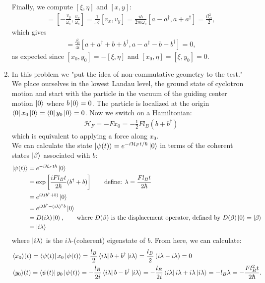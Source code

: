 \documentclass{article}
\theoremstyle{definition}
\newcommand{\ham}{\mathcal{H}}
\newcommand{\be}{\beta}
\newcommand{\f}[2]{\frac{#1}{#2}}
\newcommand{\lp}{\left(}
\newcommand{\rp}{\right)}
\newcommand{\lb}{\left[}
\newcommand{\rb}{\right]}
\begin{document}
\begin{enumerate}[label=\alph*)]
	\noindent Finally, we compute $[\xi,\eta]$ and $[x,y]$:
	\begin{align*}
	[\xi,\eta] = \lb -\f{v_y}{\omega_c}, \f{v_x}{\omega_c} \rb = \f{1}{\omega_c^2}[v_x,v_y] = \f{i\hbar }{2m\omega_c} [a-a^\dagger , a+a^\dagger] = \f{il_B^2}{2},
	\end{align*}
	which gives
	\begin{align*}
	[x,y] = \f{l_B^2}{4i} [a+a^\dagger + b+b^\dagger, a-a^\dagger - b + b^\dagger] = 0,
	\end{align*}
	as expected since $[x_0,y_0] = -[\xi,\eta]$ and $[x_0,\eta] = [\xi,y_0] = 0$. 
	
	\item In this problem we "put the idea of non-commutative geometry to the test." We place ourselves in the lowest Landau level, the ground state of cyclotron motion and start with the particle in the vacuum of the guiding center motion $\ket{0}$ where $b\ket{0} = 0$. The particle is localized at the origin $\bra{0} x_0 \ket{0} = \bra{0} y_0 \ket{0} = 0$. Now we switch on a Hamiltonian:
	\begin{align*}
		\ham_F = -F x_0 = -\f{1}{2} Fl_B (b+b^\dagger)
	\end{align*}
	which is equivalent to applying a force along $x_0$. \\
	
	We can calculate the state $\ket{\psi(t)} = e^{-i\ham_F t/\hbar}\ket{0}$ in terms of the coherent states $\ket{\be}$ associated with $b$:
	\begin{align*}
		\ket{\psi(t)} 
		&= e^{-i\ham_F t\hbar} \ket{0} \\ 
		&= \exp\lb \f{iFl_B t}{2\hbar} (b^\dagger + b) \rb \quad\quad \text{define:  } \lambda = \f{Fl_B t}{2\hbar} \\
		&= e^{i\lambda(b^\dagger + b)} \ket{0}\\
		&= e^{i\lambda b^\dagger - (i\lambda)^* b} \ket{0} \\
		&= D(i\lambda) \ket{0}, \quad\quad \text{where $D(\be)$ is the displacement operator, defined by $D(\be)\ket{0} = \ket{\be}$} \\
		&= \ket{i\lambda}
	\end{align*}
	where $\ket{i\lambda}$ is the $i\lambda$-(coherent) eigenstate of $b$. From here, we can calculate:
	\begin{align*}
		&\langle x_0 \rangle (t) = \bra{\psi(t)} x_0 \ket{\psi(t)} = \f{l_B}{2}\bra{i\lambda} b+b^\dagger \ket{i\lambda} = \f{l_B}{2}\lp i\lambda - i\lambda \rp = 0\\
		&\langle y_0 \rangle (t) = \bra{\psi(t)} y_0 \ket{\psi(t)} = -\f{l_B}{2i}\bra{i\lambda} b -b^\dagger \ket{i\lambda} = -\f{l_B}{2i} \bra{i\lambda} i\lambda + i\lambda \ket{i\lambda} = -l_B\lambda = -\f{F l_B^2 t }{2\hbar}.
	\end{align*}
\end{enumerate}
\end{document}
